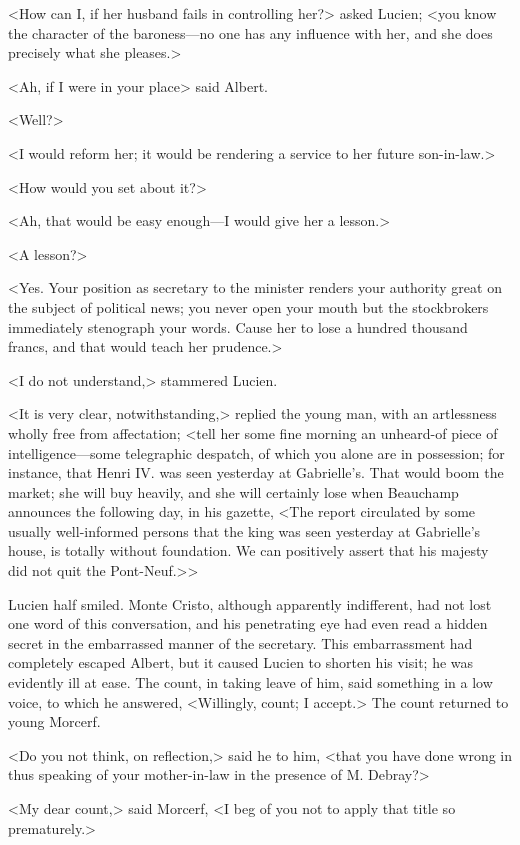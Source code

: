  <How can I, if her husband fails in controlling her?> asked Lucien; <you know the character of the baroness—no one has any influence with her, and she does precisely what she pleases.> 

 <Ah, if I were in your place\longdash> said Albert. 

 <Well?> 

 <I would reform her; it would be rendering a service to her future son-in-law.> 

 <How would you set about it?> 

 <Ah, that would be easy enough—I would give her a lesson.> 

 <A lesson?> 

 <Yes. Your position as secretary to the minister renders your authority great on the subject of political news; you never open your mouth but the stockbrokers immediately stenograph your words. Cause her to lose a hundred thousand francs, and that would teach her prudence.> 

 <I do not understand,> stammered Lucien. 

 <It is very clear, notwithstanding,> replied the young man, with an artlessness wholly free from affectation; <tell her some fine morning an unheard-of piece of intelligence—some telegraphic despatch, of which you alone are in possession; for instance, that Henri IV. was seen yesterday at Gabrielle's. That would boom the market; she will buy heavily, and she will certainly lose when Beauchamp announces the following day, in his gazette, <The report circulated by some usually well-informed persons that the king was seen yesterday at Gabrielle's house, is totally without foundation. We can positively assert that his majesty did not quit the Pont-Neuf.>> 

 Lucien half smiled. Monte Cristo, although apparently indifferent, had not lost one word of this conversation, and his penetrating eye had even read a hidden secret in the embarrassed manner of the secretary. This embarrassment had completely escaped Albert, but it caused Lucien to shorten his visit; he was evidently ill at ease. The count, in taking leave of him, said something in a low voice, to which he answered, <Willingly, count; I accept.> The count returned to young Morcerf. 

 <Do you not think, on reflection,> said he to him, <that you have done wrong in thus speaking of your mother-in-law in the presence of M. Debray?> 

 <My dear count,> said Morcerf, <I beg of you not to apply that title so prematurely.> 

